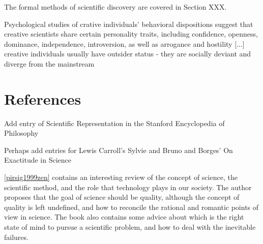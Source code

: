 The formal methods of scientific discovery are covered in Section XXX.

{\color{red} Psychological studies of crative individuals' behavioral dispositions suggest that creative scientists share certain personality traits, including confidence, openness, dominance, independence, introversion, as well as arrogance and hostility [...] creative individuals usually have outsider status - they are socially deviant and diverge from the mainstream}

%
%

\section*{References}

{\color{red} Add entry of Scientific Representation in the Stanford Encyclopedia of Philosophy}

{\color{red} Perhaps add entries for Lewis Carroll's Sylvie and Bruno and Borges' On Exactitude in Science}

\ref{pirsig1999zen} contains an interesting review of the concept of science, the scientific method, and the role that technology plays in our society. The author proposes that the goal of science should be quality, although the concept of quality is left undefined, and how to reconcile the rational and romantic points of view in science. The book also contains some advice about which is the right state of mind to pursue a scientific problem, and how to deal with the inevitable failures.


